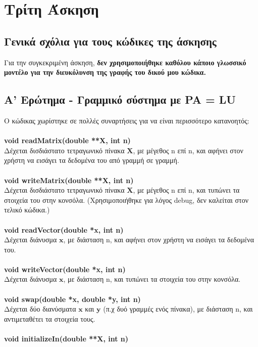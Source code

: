 \documentclass[a4paper, 14pt]{article}   %
\begin{document}
\section*{Τρίτη Άσκηση}   %

\subsection*{Γενικά σχόλια για τους κώδικες της άσκησης}   %
	Για την συγκεκριμένη άσκηση, \textbf{δεν χρησιμοποιήθηκε καθόλου κάποιο γλωσσικό μοντέλο για την διευκόλυνση της γραφής του δικού μου κώδικα.}

\subsection*{Α' Ερώτημα - Γραμμικό σύστημα με PA = LU}  %
	Ο κώδικας χωρίστηκε σε πολλές συναρτήσεις για να είναι περισσότερο κατανοητός:\\\\
\textbf{void readMatrix(double **X, int n)}\\
	Δέχεται δισδιάστατο τετραγωνικό πίνακα $\mathbf{X}$, με μέγεθος n επί n, και αφήνει στον χρήστη να εισάγει τα δεδομένα του από γραμμή σε γραμμή.\\\\
\textbf{void writeMatrix(double **X, int n)}\\
	Δέχεται δισδιάστατο τετραγωνικό πίνακα $\mathbf{X}$, με μέγεθος n επί n, και τυπώνει τα στοιχεία του στην κονσόλα. (Χρησιμοποιήθηκε για λόγος debug, δεν καλείται στον τελικό κώδικα.)\\\\
\textbf{void readVector(double *x, int n)}\\
	Δέχεται διάνυσμα $\mathbf{x}$, με διάσταση n, και αφήνει στον χρήστη να εισάγει τα δεδομένα του.\\\\
\textbf{void writeVector(double *x, int n)}\\
	Δέχεται διάνυσμα $\mathbf{x}$, με διάσταση n, και τυπώνει τα στοιχεία του στην κονσόλα.\\\\
\textbf{void swap(double *x, double *y, int n)}\\
	Δέχεται δύο διανύσματα $\mathbf{x}$ και $\mathbf{y}$ (π.χ δυό γραμμές ενός πίνακα), με διάσταση n, και αντιμεταθέτει τα στοιχεία τους.\\\\
\textbf{void initializeIn(double **X, int n)}\\
\end{document}
